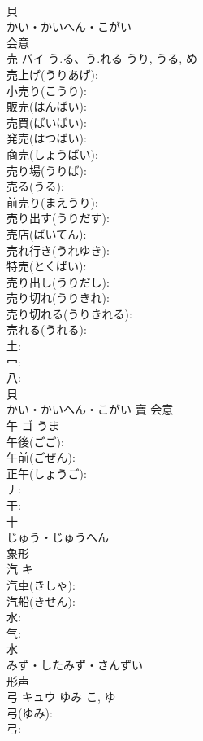 \documentclass[8pt]{extreport}
\begin{document}
\begin{CJK}{UTF8}{min}
\\	貝	
\\	かい・かいへん・こがい	
\\	会意 
\\	売	バイ	う.る、う.れる	うり, うる, め	
\\	売上げ(うりあげ): 
\\	小売り(こうり): 
\\	販売(はんばい): 
\\	売買(ばいばい): 
\\	発売(はつばい): 
\\	商売(しょうばい): 
\\	売り場(うりば): 
\\	売る(うる): 
\\	前売り(まえうり): 
\\	売り出す(うりだす): 
\\	売店(ばいてん): 
\\	売れ行き(うれゆき): 
\\	特売(とくばい): 
\\	売り出し(うりだし): 
\\	売り切れ(うりきれ): 
\\	売り切れる(うりきれる): 
\\	売れる(うれる): 
\\	土: 
\\	冖: 
\\	八: 
\\	貝	
\\	かい・かいへん・こがい	賣	会意 
\\	午	ゴ	うま		
\\	午後(ごご): 
\\	午前(ごぜん): 
\\	正午(しょうご): 
\\	丿: 
\\	干: 
\\	十	
\\	じゅう・じゅうへん	
\\	象形 
\\	汽	キ			
\\	汽車(きしゃ): 
\\	汽船(きせん): 
\\	水: 
\\	气: 
\\	水	
\\	みず・したみず・さんずい	
\\	形声 
\\	弓	キュウ	ゆみ	こ, ゆ	
\\	弓(ゆみ): 
\\	弓: 

\end{CJK}
\end{document}

